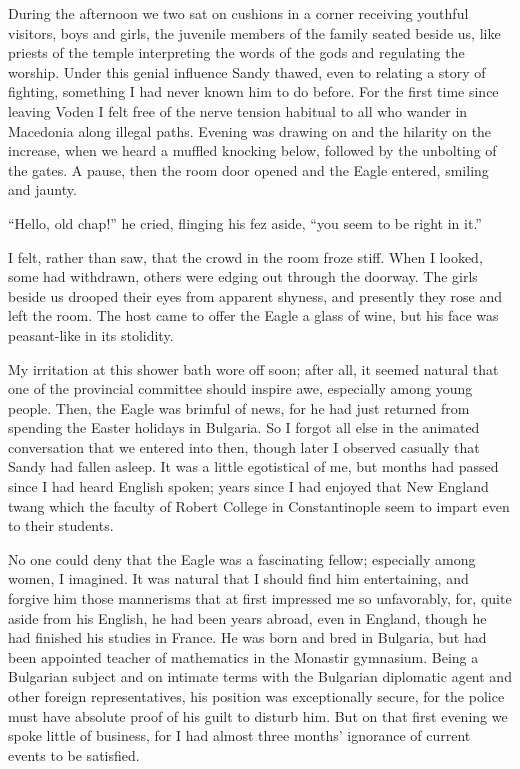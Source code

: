\documentclass[a5paper,12pt]{book}
\begin{document}
During the afternoon we two sat on cushions in a corner receiving youthful visitors, boys and girls, the juvenile members of the family seated beside us, like priests of the temple interpreting the words of the gods and regulating the worship. Under this genial influence Sandy thawed, even to relating a story of fighting, something I had never known him to do before. For the first time since leaving Voden I felt free of the nerve tension habitual to all who wander in Macedonia along illegal paths.
Evening was drawing on and the hilarity on the increase, when we heard a muffled knocking below, followed by the unbolting of the gates. A pause, then the room door opened and the Eagle entered, smiling and jaunty. 

“Hello, old chap!” he cried, flinging his fez aside, “you seem to be right in it.” 

I felt, rather than saw, that the crowd in the room froze stiff. When I looked, some had withdrawn, others were edging out through the doorway. The girls beside us drooped their eyes from apparent shyness, and presently they rose and left the room. The host came to offer the Eagle a glass of wine, but his face was peasant-like in its stolidity. 

My irritation at this shower bath wore off soon; after all, it seemed natural that one of the provincial committee should inspire awe, especially among young people. Then, the Eagle was brimful of news, for he had just returned from spending the Easter holidays in Bulgaria. So I forgot all else in the animated conversation that we entered into then, though later I observed casually that Sandy had fallen asleep. It was a little egotistical of me, but months had passed since I had heard English spoken; years since I had enjoyed that New England twang which the faculty of Robert College in Constantinople seem to impart even to their students. 

No one could deny that the Eagle was a fascinating fellow; especially among women, I imagined. It was natural that I should find him entertaining, and forgive him those mannerisms that at first impressed me so unfavorably, for, quite aside from his English, he had been years abroad, even in England, though he had finished his studies in France. He was born and bred in Bulgaria, but had been appointed teacher of mathematics in the Monastir gymnasium. Being a Bulgarian subject and on intimate terms with the Bulgarian diplomatic agent and other foreign representatives, his position was exceptionally secure, for the police must have absolute proof of his guilt to disturb him. But on that first evening we spoke little of business, for I had almost three months’ ignorance of current events to be satisfied. 
\end{document}
